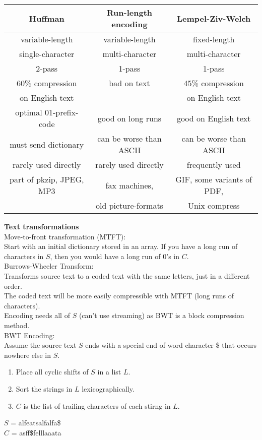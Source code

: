 \documentclass[12pt]{article}
\newcommand{\vis}{\textvisiblespace}
\begin{document}
{\begin{tabular}{c|c|c}
	\textbf{Huffman} & \textbf{Run-length encoding} & \textbf{Lempel-Ziv-Welch}\\
	\hline
	variable-length & variable-length & fixed-length\\
	\hline
	single-character & multi-character & multi-character\\
	\hline
	2-pass & 1-pass & 1-pass \\
	\hline
	60\% compression  & bad on text & 45\% compression\\
	on English text & & on English text\\
	\hline
	optimal 01-prefix-code & good on long runs & good on English text\\
	\hline
	must send dictionary & can be worse than ASCII &  can be worse than ASCII\\
	\hline
	rarely used directly & rarely used directly & frequently used\\
	\hline
	part of pkzip, JPEG, MP3 & fax machines, & GIF, some variants of PDF,\\
	& old picture-formats& Unix compress
\end{tabular}

\textbf{Text transformations}\\

Move-to-front transformation (MTFT): \\
Start with an initial dictionary stored in an array. If you have a long run of characters in $S$, then you would have a long run of 0's in $C$.\\

Burrows-Wheeler Transform:\\
Transforms source text to a coded text with the same letters, just in a different order.\\
The coded text will be more easily compressible with MTFT (long runs of characters).\\
Encoding needs all of $S$ (can't use streaming) as BWT is a block compression method.\\

BWT Encoding:\\
Assume the source text $S$ ends with a special end-of-word character \$ that occurs nowhere else in $S$. 
\begin{enumerate}
	\item Place all cyclic shifts of $S$ in a list $L$.
	\item Sort the strings in $L$ lexicographically.
	\item $C$ is the list of trailing characters of each stirng in $L$.
\end{enumerate}
$S$ = alf\vis eats\vis alfalfa\$\\
$C$ = asff\$f\vis e\vis lllaaata\\

}
\end{document}
